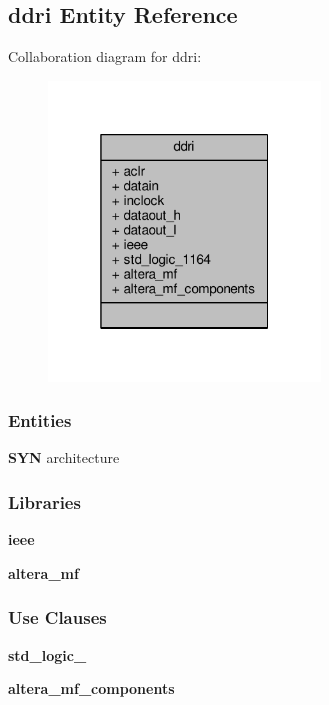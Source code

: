 \subsection{ddri Entity Reference}
\label{classddri}


Collaboration diagram for ddri\+:\nopagebreak
\begin{figure}[H]
\begin{center}
\leavevmode
\includegraphics[width=205pt]{d4/d71/classddri__coll__graph}
\end{center}
\end{figure}
\subsubsection*{Entities}
\begin{DoxyCompactItemize}
\item 
{\bf S\+YN} architecture
\end{DoxyCompactItemize}
\subsubsection*{Libraries}
 \begin{DoxyCompactItemize}
\item 
{\bf ieee} 
\item 
{\bf altera\+\_\+mf} 
\end{DoxyCompactItemize}
\subsubsection*{Use Clauses}
 \begin{DoxyCompactItemize}
\item 
{\bf std\+\_\+logic\+\_}   
\item 
{\bf altera\+\_\+mf\+\_\+components}   
\end{DoxyCompactItemize}
